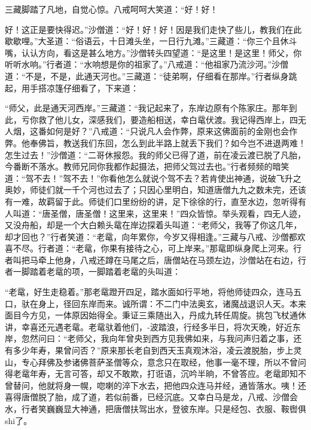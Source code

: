 \documentclass[12pt,UTF8]{ctexbook}
\begin{document}
{	三藏脚踏了凡地，自觉心惊。八戒呵呵大笑道：“好！好！
	
	好！这正是要快得迟。”沙僧道：“好！好！好！因是我们走快了些儿，教我们在此歇歇哩。”大圣道：“俗语云，十日滩头坐，一日行九滩。”三藏道：“你三个且休斗嘴，认认方向，看这是甚么地方。”沙僧转头四望道：“是这里！是这里！师父，你听听水响。”行者道：“水响想是你的祖家了。”八戒道：“他祖家乃流沙河。”沙僧道：“不是，不是，此通天河也。”三藏道：“徒弟啊，仔细看在那岸。”行者纵身跳起，用手搭凉篷仔细看了，下来道：
	
	“师父，此是通天河西岸。”三藏道：“我记起来了，东岸边原有个陈家庄。那年到此，亏你救了他儿女，深感我们，要造船相送，幸白鼋伏渡。我记得西岸上，四无人烟，这番如何是好？”八戒道：“只说凡人会作弊，原来这佛面前的金刚也会作弊。他奉佛旨，教送我们东回，怎么到此半路上就丢下我们？如今岂不进退两难！怎生过去！”沙僧道：“二哥休报怨。我的师父已得了道，前在凌云渡已脱了凡胎，今番断不落水。教师兄同你我都作起摄法，把师父驾过去也。”行者频频的暗笑道：“驾不去！”驾不去！”你看他怎么就说个驾不去？若肯使出神通，说破飞升之奥妙，师徒们就一千个河也过去了；只因心里明白，知道唐僧九九之数未完，还该有一难，故羁留于此。师徒们口里纷纷的讲，足下徐徐的行，直至水边，忽听得有人叫道：“唐圣僧，唐圣僧！这里来，这里来！”四众皆惊。举头观看，四无人迹，又没舟船，却是一个大白赖头鼋在岸边探着头叫道：“老师父，我等了你这几年，却才回也？”行者笑道：“老鼋，向年累你，今岁又得相逢。”三藏与八戒、沙僧都欢喜不尽。行者道：“老鼋，你果有接待之心，可上岸来。”那鼋即纵身爬上河来。行者叫把马牵上他身，八戒还蹲在马尾之后，唐僧站在马颈左边，沙僧站在右边，行者一脚踏着老鼋的项，一脚踏着老鼋的头叫道：
	
	“老鼋，好生走稳着。”那老鼋蹬开四足，踏水面如行平地，将他师徒四众，连马五口，驮在身上，径回东岸而来。诚所谓：不二门中法奥玄，诸魔战退识人天。本来面目今方见，一体原因始得全。秉证三乘随出入，丹成九转任周旋。挑包飞杖通休讲，幸喜还元遇老鼋。老鼋驮着他们，-波踏浪，行经多半日，将次天晚，好近东岸，忽然问曰：“老师父，我向年曾央到西方见我佛如来，与我问声归着之事，还有多少年寿，果曾问否？”原来那长老自到西天玉真观沐浴，凌云渡脱胎，步上灵山，专心拜佛及参诸佛菩萨圣僧等众，意念只在取经，他事一毫不理，所以不曾问得老鼋年寿，无言可答，却又不敢欺，打诳语，沉吟半晌，不曾答应。老鼋即知不曾替问，他就将身一幌，唿喇的淬下水去，把他四众连马并经，通皆落水。咦！还喜得唐僧脱了胎，成了道，若似前番，已经沉底。又幸白马是龙，八戒、沙僧会水，行者笑巍巍显大神通，把唐僧扶驾出水，登彼东岸。只是经包、衣服、鞍辔俱shi了。
	
}
\end{document}
